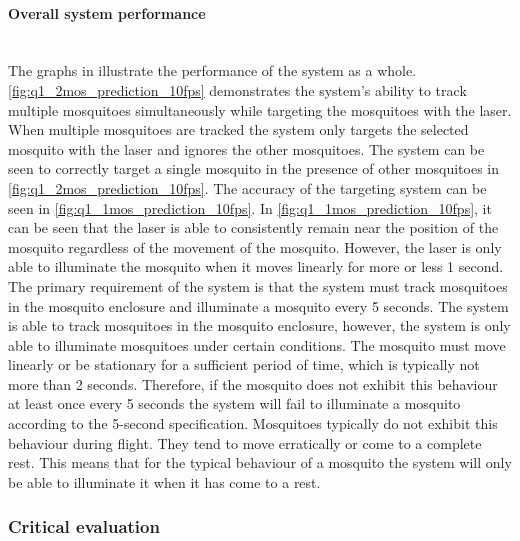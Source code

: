 \paragraph{Overall system performance}\hfill\\
The graphs in  illustrate the performance of the system as a whole. \autoref{fig:q1_2mos_prediction_10fps} demonstrates the system's ability to track multiple mosquitoes simultaneously while targeting the mosquitoes with the laser. When multiple mosquitoes are tracked the system only targets the selected mosquito with the laser and ignores the other mosquitoes. The system can be seen to correctly target a single mosquito in the presence of other mosquitoes in \autoref{fig:q1_2mos_prediction_10fps}. The accuracy of the targeting system can be seen in \autoref{fig:q1_1mos_prediction_10fps}. In \autoref{fig:q1_1mos_prediction_10fps}, it can be seen that the laser is able to consistently remain near the position of the mosquito regardless of the movement of the mosquito. However, the laser is only able to illuminate the mosquito when it moves linearly for more or less 1 second. The primary requirement of the system is that the system must track mosquitoes in the mosquito enclosure and illuminate a mosquito every 5 seconds. The system is able to track mosquitoes in the mosquito enclosure, however, the system is only able to illuminate mosquitoes under certain conditions. The mosquito must move linearly or be stationary for a sufficient period of time, which is typically not more than 2 seconds. Therefore, if the mosquito does not exhibit this behaviour at least once every 5 seconds the system will fail to illuminate a mosquito according to the 5-second specification. Mosquitoes typically do not exhibit this behaviour during flight. They tend to move erratically or come to a complete rest. This means that for the typical behaviour of a mosquito the system will only be able to illuminate it when it has come to a rest.

\subsubsection{Critical evaluation}


